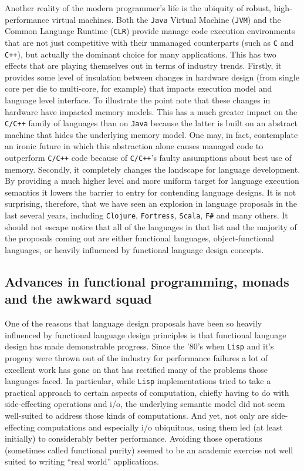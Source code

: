Another reality of the modern programmer's life is the ubiquity of
robust, high-performance virtual machines. Both the \texttt{Java}
Virtual Machine (\texttt{JVM}) and the Common Language Runtime
(\texttt{CLR}) provide manage code execution environments that are not
just competitive with their unmanaged counterparts (such as \texttt{C}
and \texttt{C++}), but actually the dominant choice for many
applications. This has two effects that are playing themselves out in
terms of industry trends. Firstly, it provides some level of
insulation between changes in hardware design (from single core per
die to multi-core, for example) that impacts execution model and
language level interface. To illustrate the point note that these
changes in hardware have impacted memory models. This has a much
greater impact on the \texttt{C/C++} family of languages than on
\texttt{Java} because the latter is built on an abstract machine that
hides the underlying memory model. One may, in fact, contemplate an
ironic future in which this abstraction alone causes managed code to
outperform \texttt{C/C++} code because of \texttt{C/C++}'s faulty
assumptions about best use of memory. Secondly, it completely changes
the landscape for language development. By providing a much higher
level and more uniform target for language execution semantics it
lowers the barrier to entry for contending language designs. It is not
surprising, therefore, that we have seen an explosion in language
proposals in the last several years, including \texttt{Clojure},
\texttt{Fortress}, \texttt{Scala}, \texttt{F\#} and many others. It
should not escape notice that all of the languages in that list and
the majority of the proposals coming out are either functional
languages, object-functional languages, or heavily influenced by
functional language design concepts.

\subsection{Advances in functional programming, monads and the awkward squad}

One of the reasons that language design proposals have been so heavily
influenced by functional language design principles is that functional
language design has made demonstrable progress. Since the '80's when
\texttt{Lisp} and it's progeny were thrown out of the industry for
performance failures a lot of excellent work has gone on that has
rectified many of the problems those languages faced. In particular,
while \texttt{Lisp} implementations tried to take a practical approach
to certain aspects of computation, chiefly having to do with
side-effecting operations and i/o, the underlying semantic model did
not seem well-suited to address those kinds of computations. And yet,
not only are side-effecting computations and especially i/o
ubiquitous, using them led (at least initially) to considerably better
performance. Avoiding those operations (sometimes called functional
purity) seemed to be an academic exercise not well suited to writing
``real world'' applications.

